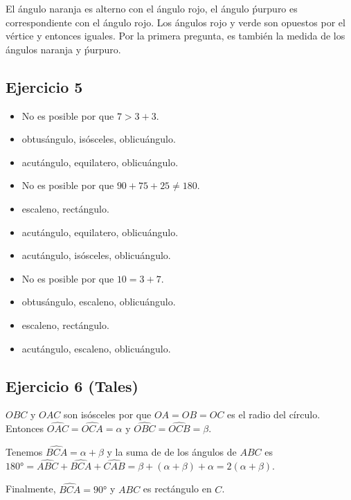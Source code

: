El ángulo naranja es alterno con el ángulo rojo, el ángulo ṕurpuro es
correspondiente con el ángulo rojo. Los ángulos rojo y verde son opuestos
por el vértice y entonces iguales. Por la primera pregunta,
es también la medida de los ángulos naranja y ṕurpuro.

\subsection*{Ejercicio 5}

\begin{itemize}
\item No es posible por que $7 > 3 + 3$.
\item obtusángulo, isósceles, oblicuángulo.
\item acutángulo, equilatero, oblicuángulo.
\item No es posible por que $90 + 75 + 25 \neq 180$.
\item escaleno, rectángulo.
\item acutángulo, equilatero, oblicuángulo.
\item acutángulo, isósceles, oblicuángulo.
\item No es posible por que $10 = 3 + 7$.
\item obtusángulo, escaleno, oblicuángulo.
\item escaleno, rectángulo.
\item acutángulo, escaleno, oblicuángulo.
\end{itemize}

\subsection{Ejercicio 6 (Tales)}

$OBC$ y $OAC$ son isósceles por que $OA = OB = OC$ es el radio del círculo.
Entonces $\widehat{OAC} = \widehat{OCA} = \alpha$ y
$\widehat{OBC} = \widehat{OCB} = \beta$.

Tenemos $\widehat{BCA} = \alpha+\beta$ y
la suma de de los ángulos de $ABC$ es
$180° = \widehat{ABC} + \widehat{BCA} + \widehat{CAB} =
\beta + {(\alpha+\beta)} + \alpha = 2\left(\alpha+\beta\right)$.

Finalmente, $\widehat{BCA} = 90°$ y $ABC$ es rectángulo en $C$.
